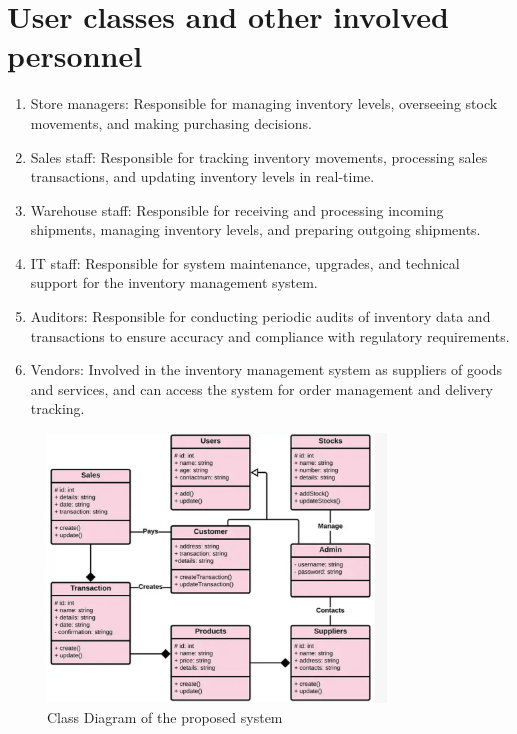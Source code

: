 \section{User classes and other involved personnel \label{Section::Userclassesandotherinvolvedpersonnel}}
\begin{enumerate}
    \item Store managers: Responsible for managing inventory levels, overseeing stock movements, and making purchasing decisions.

    \item Sales staff: Responsible for tracking inventory movements, processing sales transactions, and updating inventory levels in real-time.

    \item Warehouse staff: Responsible for receiving and processing incoming shipments, managing inventory levels, and preparing outgoing shipments.

    \item IT staff: Responsible for system maintenance, upgrades, and technical support for the inventory management system.

    \item Auditors: Responsible for conducting periodic audits of inventory data and transactions to ensure accuracy and compliance with regulatory requirements.

    \item Vendors: Involved in the inventory management system as suppliers of goods and services, and can access the system for order management and delivery tracking.
\end{enumerate}
\begin{figure}[H]
  \centering
   \includegraphics[width=9cm]{Figures/ClassDiagram.jpeg}
  \caption{Class Diagram of the proposed system}
\label{}
\end{figure}

